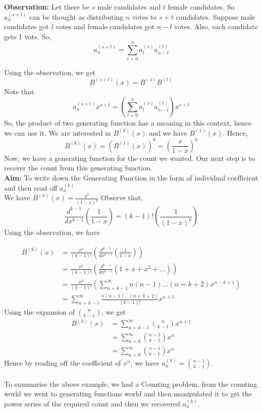 \noindent \textbf{Observation:} Let there be $s$ male candidates and $t$ female candidates. So $a_n^{(s+t)}$ can be thought as distributing $n$ votes to $s+t$ candidates. Suppose male candidates got $l$ votes and female candidates got $n-l$ votes. Also, each candidate gets 1 vote. So,
$$a_n^{(s+t)}=\sum_{l=0}^n a_l^{(s)}a_{n-l}^{(t)}$$

Using the observation, we get $$B^{(s+t)}(x)= B^{(s)}B^{(t)}$$
Note that $$a_n^{(s+t)}x^{s+t}=\left(\sum_{l=0}^n a_l^{(s)}a_{n-l}^{(t)}\right)x^{s+t}$$
So, the product of two generating function has a meaning in this context, hence we can use it. We are interested in $B^{(k)}(x)$ and we have $B^{(1)}(x)$. Hence, $$B^{(k)}(x)=\left(B^{(1)}(x)\right)^k=\left(\frac{x}{1-x}\right)^k$$
Now, we have a generating function for the count we wanted. Our next step is to recover the count from this generating function.\\

\noindent \textbf{Aim:} To write down the Generating Function in the form of individual coefficient and then read off $a_n^{(k)}$\\
We have $B^{(k)}(x)=\frac{x^k}{(1-x)^k}$
Observe that, $$\frac{d^{k-1}}{dx^{k-1}}\left(\frac{1}{1-x}\right)=(k-1)!\left(\frac{1}{(1-x)^k}\right)$$
Using the observation, we have 

\begin{align*}
    B^{(k)}(x) & = \frac{x^k}{(k-1)!}\left(\frac{d^{k-1}}{dx^{k-1}}\left(\frac{1}{1-x}\right)\right)\\
    & = \frac{x^k}{(k-1)!}\left(\frac{d^{k-1}}{dx^{k-1}}(1+x+x^2+\dots)\right)\\
    &= \frac{x^k}{(k-1)!}\left(\sum_{n=k-1}^\infty n(n-1)\dots (n=k+2)x^{n-k+1}\right) \\
    & =\sum_{n=k-1}^\infty \frac{n(n-1)\dots (n=k+2)}{(k-1)!} x^{n+1}
\end{align*}
Using the expansion of ${n \choose k-1}$, we get
\begin{align*}
     B^{(k)}(x) & =\sum_{n=k-1}^\infty {n \choose k-1} x^{n+1}\\
     & =\sum_{n=k}^\infty {n-1 \choose k-1} x^{n}\\
     &= \sum_{n=0}^\infty {n-1 \choose k-1} x^{n}
\end{align*}
Hence by reading off the coefficient of $x^n$, we have $a_n^{(k)}={n-1 \choose k-1}$.

\paragraph{} To summarise the above example,
 we had a Counting problem, from the counting world we went to generating functions world and then manipulated it to get the power series of the required count and then we recovered $a_n^{(k)}$.

